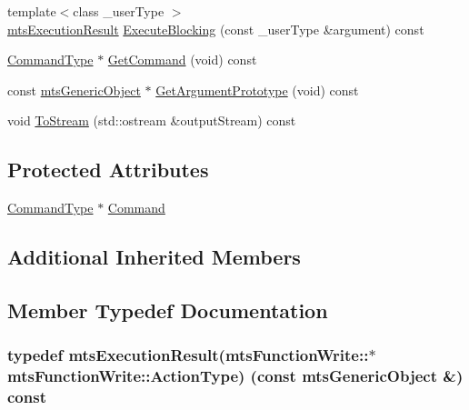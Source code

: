 \begin{DoxyCompactItemize}
\item 
{\footnotesize template$<$class \+\_\+user\+Type $>$ }\\\hyperlink{classmts_execution_result}{mts\+Execution\+Result} \hyperlink{classmts_function_write_a6485d6f43ce827afed11a155c43dbeef}{Execute\+Blocking} (const \+\_\+user\+Type \&argument) const 
\item 
\hyperlink{classmts_function_write_a4b81286be87adec18b358ebaa9ebb2be}{Command\+Type} $\ast$ \hyperlink{classmts_function_write_ad8f4d561ea927be81b0bfe73f1d360eb}{Get\+Command} (void) const 
\item 
const \hyperlink{classmts_generic_object}{mts\+Generic\+Object} $\ast$ \hyperlink{classmts_function_write_ab3d6c6e2a28441d5cf0eb2ecd6ff8140}{Get\+Argument\+Prototype} (void) const 
\item 
void \hyperlink{classmts_function_write_a3e7e0298146311a8adae45c0441891b7}{To\+Stream} (std\+::ostream \&output\+Stream) const 
\end{DoxyCompactItemize}
\subsection*{Protected Attributes}
\begin{DoxyCompactItemize}
\item 
\hyperlink{classmts_function_write_a4b81286be87adec18b358ebaa9ebb2be}{Command\+Type} $\ast$ \hyperlink{classmts_function_write_ac457eca9ee4e0f8bfc4b2c8a9b3a7927}{Command}
\end{DoxyCompactItemize}
\subsection*{Additional Inherited Members}


\subsection{Member Typedef Documentation}
\hypertarget{classmts_function_write_acdce6b414e90dfb8c05bab5e7a2db81b}{}
\subsubsection[{Action\+Type}]{\setlength{\rightskip}{0pt plus 5cm}typedef {\bf mts\+Execution\+Result}(mts\+Function\+Write\+::$\ast$ mts\+Function\+Write\+::\+Action\+Type) (const {\bf mts\+Generic\+Object} \&) const }\label{classmts_function_write_acdce6b414e90dfb8c05bab5e7a2db81b}
\hypertarget{classmts_function_write_a4b81286be87adec18b358ebaa9ebb2be}{}
